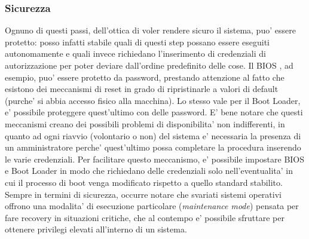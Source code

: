 \subsubsection{Sicurezza}
Ognuno di questi passi, dell'ottica di voler rendere sicuro il sistema, puo' essere protetto:
posso infatti stabile quali di questi step possano essere eseguiti autonomamente e quali invece richiedano l'inserimento di credenziali di autorizzazione per poter deviare dall'ordine predefinito delle cose. Il BIOS , ad esempio, puo' essere protetto da password, prestando attenzione al fatto che esistono dei meccanismi di reset in grado di ripristinarle a valori di default (purche' si abbia accesso fisico alla macchina). Lo stesso vale per il Boot Loader, e' possibile proteggere quest'ultimo con delle password. E' bene notare che questi meccanismi creano dei possibili problemi di disponibilita' non indifferenti, in quanto ad ogni riavvio (volontario o non) del sistema e' necessaria la presenza di un amministratore perche' quest'ultimo possa completare la procedura inserendo le varie credenziali. Per facilitare questo meccanismo, e' possibile impostare BIOS e Boot Loader in modo che richiedano delle credenziali solo nell'eventualita' in cui il processo di boot venga modificato rispetto a quello standard stabilito.
Sempre in termini di sicurezza, occurre notare che svariati sistemi operativi offrono una modalita' di esecuzione particolare (\emph{maintenance mode}) pensata per fare recovery in situazioni critiche, che al contempo e' possibile sfruttare per ottenere privilegi elevati all'interno di un sistema.
\\
